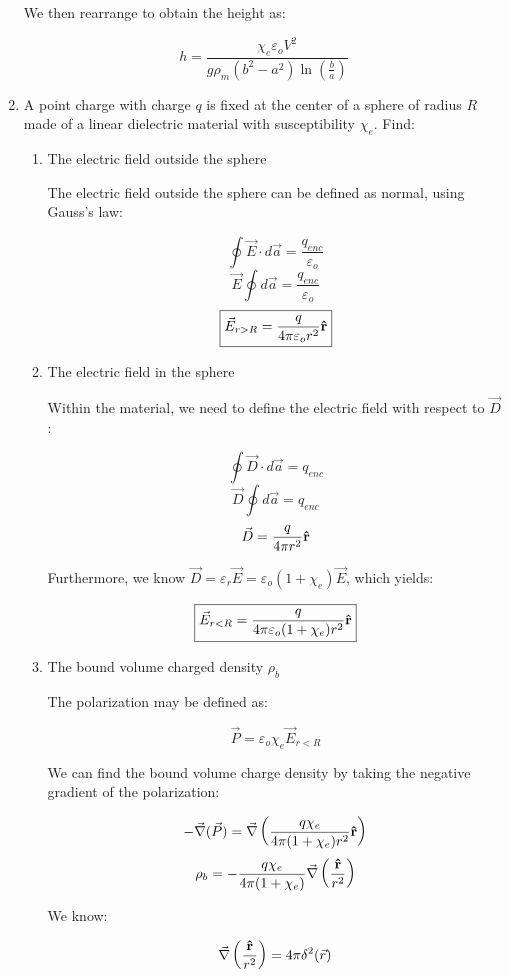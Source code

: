 \begin{enumerate}
    We then rearrange to obtain the height as:

    $$\boxed{h=\frac{\chi_e\varepsilon_o V^2}{g\rho_m(b^2-a^2)\ln\left( \frac{b}{a} \right)}}$$

  \item A point charge with charge $q$ is fixed at the center of a sphere of radius $R$ made of a linear dielectric material with susceptibility $\chi_e$. Find:

    \begin{enumerate}

      \item The electric field outside the sphere

        The electric field outside the sphere can be defined as normal, using Gauss's law:

        $$\oint \vec{E}\cdot d\vec{a}=\frac{q_{enc}}{\varepsilon_o}$$
        $$\vec{E}\oint d\vec{a}=\frac{q_{enc}}{\varepsilon_o}$$
        $$\boxed{\vec{E}_{r>R}=\frac{q}{4\pi\varepsilon_o r^2}\bold{\hat{r}}}$$

      \item The electric field in the sphere

        Within the material, we need to define the electric field with respect to $\vec{D}$:

        $$\oint \vec{D}\cdot d\vec{a}=q_{enc}$$
        $$\vec{D}\oint d\vec{a}=q_{enc}$$
        $$\vec{D}=\frac{q}{4\pi r^2}\bold{\hat{r}}$$

        Furthermore, we know $\vec{D}=\varepsilon_r\vec{E}=\varepsilon_o(1+\chi_e)\vec{E}$, which yields:

        $$\boxed{\vec{E}_{r<R}=\frac{q}{4\pi\varepsilon_o(1+\chi_e)r^2}\bold{\hat{r}}}$$

      \item The bound volume charged density $\rho_b$

        The polarization may be defined as:

        $$\vec{P}=\varepsilon_o\chi_e\vec{E}_{r<R}$$

        We can find the bound volume charge density by taking the negative gradient of the polarization:

        $$-\vec{\nabla}(\vec{P})=\vec{\nabla}\left( \frac{q\chi_e}{4\pi(1+\chi_e)r^2}\bold{\hat{r}} \right)$$
        $$\rho_b=-\frac{q\chi_e}{4\pi(1+\chi_e)}\vec{\nabla}\left( \frac{\bold{\hat{r}}}{r^2} \right)$$

        We know:

        $$\vec{\nabla}\left( \frac{\bold{\hat{r}}}{r^2} \right)=4\pi\delta^2(\vec{r})$$


\end{enumerate}
\end{enumerate}
